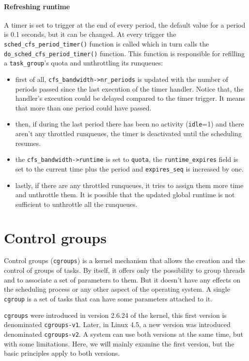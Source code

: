 \paragraph{Refreshing runtime}
A timer is set to trigger at the end of every period, the default value for a period is 0.1 seconds, but it can be changed. At every trigger the \verb|sched_cfs_period_timer()| function is called which in turn calls the \verb|do_sched_cfs_period_timer()| function. This function is responsible for refilling a \verb|task_group|'s quota and unthrottling its runqueues:
\begin{itemize}
    \item first of all, \verb|cfs_bandwidth->nr_periods| is updated with the number of periods passed since the last execution of the timer handler. Notice that, the handler's execution could be delayed compared to the timer trigger. It means that more than one period could have passed.
    \item then, if during the last period there has been no activity (\verb|idle|=1) and there aren't any throttled runqueues, the timer is deactivated until the scheduling resumes. %
    \item the \verb|cfs_bandwidth->runtime| is set to \verb|quota|, the \verb|runtime_expires| field is set to the current time plus the period and \verb|expires_seq| is increased by one.
    \item lastly, if there are any throttled runqueues, it tries to assign them more time and unthrottle them. It is possible that the updated global runtime is not sufficient to unthrottle all the runqueues.
\end{itemize}

\section{Control groups}
\label{sec:cgroup}

Control groups (\verb|cgroups|) is a kernel mechanism that allows the creation and the control of groups of tasks. By itself, it offers only the possibility to group threads and to associate a set of parameters to them. But it doesn't have any effects on the scheduling process or any other aspect of the operating system. A single \verb|cgroup| is a set of tasks that can have some parameters attached to it. 

\verb|cgroups| were introduced in version 2.6.24 of the kernel, this first version is denominated \verb|cgroups-v1|. Later, in Linux 4.5, a new version was introduced denominated \verb|cgroups-v2|. A system can use both versions at the same time, but with some limitations. Here, we will mainly examine the first version, but the basic principles apply to both versions.

